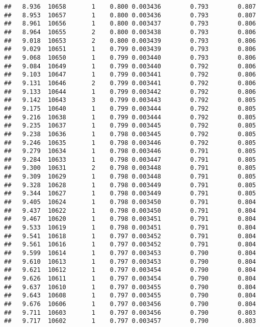 \documentclass[
]{book}
\begin{document}
\begin{verbatim}
##   8.936  10658       1    0.800 0.003436        0.793        0.807
##   8.953  10657       1    0.800 0.003436        0.793        0.807
##   8.961  10656       1    0.800 0.003437        0.793        0.806
##   8.964  10655       2    0.800 0.003438        0.793        0.806
##   9.018  10653       2    0.800 0.003439        0.793        0.806
##   9.029  10651       1    0.799 0.003439        0.793        0.806
##   9.068  10650       1    0.799 0.003440        0.793        0.806
##   9.084  10649       1    0.799 0.003440        0.792        0.806
##   9.103  10647       1    0.799 0.003441        0.792        0.806
##   9.131  10646       2    0.799 0.003441        0.792        0.806
##   9.133  10644       1    0.799 0.003442        0.792        0.806
##   9.142  10643       3    0.799 0.003443        0.792        0.805
##   9.175  10640       1    0.799 0.003444        0.792        0.805
##   9.216  10638       1    0.799 0.003444        0.792        0.805
##   9.235  10637       1    0.799 0.003445        0.792        0.805
##   9.238  10636       1    0.798 0.003445        0.792        0.805
##   9.246  10635       1    0.798 0.003446        0.792        0.805
##   9.279  10634       1    0.798 0.003446        0.791        0.805
##   9.284  10633       1    0.798 0.003447        0.791        0.805
##   9.300  10631       2    0.798 0.003448        0.791        0.805
##   9.309  10629       1    0.798 0.003448        0.791        0.805
##   9.328  10628       1    0.798 0.003449        0.791        0.805
##   9.344  10627       1    0.798 0.003449        0.791        0.805
##   9.405  10624       1    0.798 0.003450        0.791        0.804
##   9.437  10622       1    0.798 0.003450        0.791        0.804
##   9.467  10620       1    0.798 0.003451        0.791        0.804
##   9.533  10619       1    0.798 0.003451        0.791        0.804
##   9.541  10618       1    0.797 0.003452        0.791        0.804
##   9.561  10616       1    0.797 0.003452        0.791        0.804
##   9.599  10614       1    0.797 0.003453        0.790        0.804
##   9.610  10613       1    0.797 0.003453        0.790        0.804
##   9.621  10612       1    0.797 0.003454        0.790        0.804
##   9.626  10611       1    0.797 0.003454        0.790        0.804
##   9.637  10610       1    0.797 0.003455        0.790        0.804
##   9.643  10608       1    0.797 0.003455        0.790        0.804
##   9.676  10606       1    0.797 0.003456        0.790        0.804
##   9.711  10603       1    0.797 0.003456        0.790        0.803
##   9.717  10602       1    0.797 0.003457        0.790        0.803

\end{verbatim}
\end{document}
